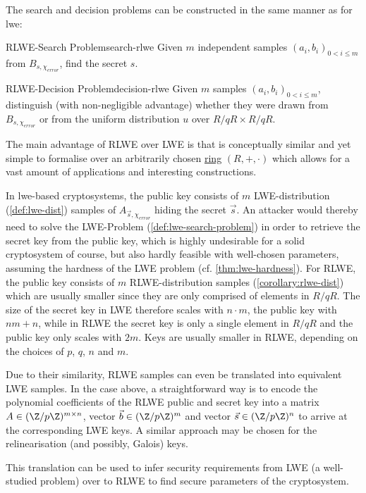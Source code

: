The search and decision problems can be constructed in the same manner as for \gls{lwe}:

\begin{corollary}{RLWE-Search Problem}{search-rlwe}
  Given $m$ independent samples $(a_i, b_i)_{0 < i \leq m}$ from $B_{s, \chi_{error}}$, find the secret $s$.
\end{corollary}
\begin{corollary}{RLWE-Decision Problem}{decision-rlwe}
  Given $m$ samples $(a_i, b_i)_{0 < i \leq m}$, distinguish (with non-negligible advantage) whether they were drawn from $B_{s, \chi_{error}}$ or from the uniform distribution $u$ over $R/qR \times R/qR$.
\end{corollary}

The main advantage of RLWE over LWE is that is conceptually similar and yet simple to formalise over an arbitrarily chosen \hyperref[def:ring]{ring} $(R, +, \cdot)$ which allows for a vast amount of applications and interesting constructions.

In \gls{lwe}-based cryptosystems, the public key consists of $m$ LWE-distribution (\cref{def:lwe-dist}) samples of $A_{\vec{s},\chi_{error}}$ hiding the secret $\vec{s}$.
An attacker would thereby need to solve the LWE-Problem (\cref{def:lwe-search-problem}) in order to retrieve the secret key from the public key, which is highly undesirable for a solid cryptosystem of course, but also hardly feasible with well-chosen parameters, assuming the hardness of the LWE problem (cf. \cref{thm:lwe-hardness}).
For RLWE, the public key consists of $m$ RLWE-distribution samples (\cref{corollary:rlwe-dist}) which are usually smaller since they are only comprised of elements in $R/qR$.
The size of the secret key in LWE therefore scales with $n \cdot m$, the public key with $nm + n$, while in RLWE the secret key is only a single element in $R/qR$ and the public key only scales with $2m$.
Keys are usually smaller in RLWE, depending on the choices of $p$, $q$, $n$ and $m$.

Due to their similarity, RLWE samples can even be translated into equivalent LWE samples.
In the case above, a straightforward way is to encode the polynomial coefficients of the RLWE public and secret key into a matrix $A \in (\Z/p\Z)^{m \times n}$, vector $\vec{b} \in (\Z/p\Z)^m$ and vector $\vec{s} \in (\Z/p\Z)^n$ to arrive at the corresponding LWE keys.
A similar approach may be chosen for the relinearisation (and possibly, Galois) keys.

This translation can be used to infer security requirements from LWE (a well-studied problem) over to RLWE to find secure parameters of the cryptosystem.

